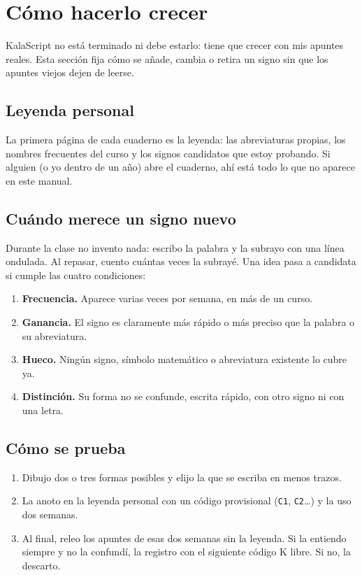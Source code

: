 \section{Cómo hacerlo crecer}\label{sec:crecer}

KalaScript no está terminado ni debe estarlo: tiene que crecer con mis apuntes
reales. Esta sección fija cómo se añade, cambia o retira un signo sin que los
apuntes viejos dejen de leerse.

\subsection{Leyenda personal}\label{sec:leyenda}
La primera página de cada cuaderno es la leyenda: las abreviaturas propias, los
nombres frecuentes del curso y los signos candidatos que estoy probando. Si
alguien (o yo dentro de un año) abre el cuaderno, ahí está todo lo que no
aparece en este manual.

\subsection{Cuándo merece un signo nuevo}
Durante la clase no invento nada: escribo la palabra y la subrayo con una línea
ondulada. Al repasar, cuento cuántas veces la subrayé. Una idea pasa a
candidata si cumple las cuatro condiciones:
\begin{enumerate}
\item \textbf{Frecuencia.} Aparece varias veces por semana, en más de un curso.
\item \textbf{Ganancia.} El signo es claramente más rápido o más preciso que
 la palabra o su abreviatura.
\item \textbf{Hueco.} Ningún signo, símbolo matemático o abreviatura existente
 lo cubre ya.
\item \textbf{Distinción.} Su forma no se confunde, escrita rápido, con otro signo
 ni con una letra.
\end{enumerate}

\subsection{Cómo se prueba}
\begin{enumerate}
\item Dibujo dos o tres formas posibles y elijo la que se escriba en menos trazos.
\item La anoto en la leyenda personal con un código provisional (\texttt{C1},
 \texttt{C2}\ldots) y la uso dos semanas.
\item Al final, releo los apuntes de esas dos semanas sin la leyenda. Si la
 entiendo siempre y no la confundí, la registro con el siguiente código K libre.
 Si no, la descarto.
\end{enumerate}

